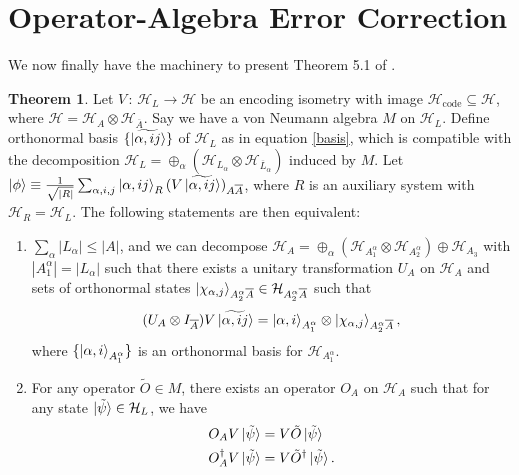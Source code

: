 \documentclass[12pt,a4paper]{report}
\numberwithin{equation}{section}
\newcommand{\Hcode}{\mathcal{H}_{\text{code}}}
\newcommand{\ol}[1]{\overline{#1}}
\theoremstyle{definition}
\theoremstyle{theorem}
\newtheorem{theorem}{Theorem}[section]
\theoremstyle{theorem}
\theoremstyle{example}
\theoremstyle{definition}
\begin{document}
\section{Operator-Algebra Error Correction}
We now finally have the machinery to present Theorem 5.1 of \cite{Harlow}.
\begin{theorem}\label{5.1}
	Let $V\,:\,\mathcal{H}_{L}\to \mathcal{H}$ be an encoding isometry with image $\Hcode\subseteq\mathcal{H}$, where $\mathcal{H}=\mathcal{H}_{A}\otimes\mathcal{H}_{\ol{A}}$. Say we have a von Neumann algebra $M$ on $\mathcal{H}_{L}$. Define orthonormal basis $\{\ket{\widetilde{\alpha,ij}}\}$ of $\mathcal{H}_{L}$ as in equation \ref{basis}, which is compatible with the decomposition $\mathcal{H}_{L}=\oplus_{\alpha}(\mathcal{H}_{L_{\alpha}}\otimes\mathcal{H}_{\ol{L}_{\alpha}})$ induced by $M$. Let $\ket{\phi}\equiv\frac{1}{\sqrt{|R|}}\sum_{\alpha,i,j}\ket{\alpha,ij}_{R}(V\ket{\widetilde{\alpha,ij}})_{A\ol{A}}$, where $R$ is an auxiliary system with $\mathcal{H}_{R}=\mathcal{H}_{L}$. The following statements are then equivalent:
	\begin{enumerate}
		\item \label{o1} $\sum_{\alpha}|L_{\alpha}|\leq|A|$, and we can decompose $\mathcal{H}_{A}=\oplus_{\alpha}(\mathcal{H}_{A_{1}^{\alpha}}\otimes\mathcal{H}_{A_{2}^{\alpha}})\oplus\mathcal{H}_{A_{3}}$ with $|A_{1}^{\alpha}|=|L_{\alpha}|$ such that there exists a unitary transformation $U_{A}$ on $\mathcal{H}_{A}$ and sets of orthonormal states $\ket{\chi_{\alpha,j}}_{A_{2}^{\alpha}\ol{A}}\in\mathcal{H}_{A_{2}^{\alpha}\ol{A}}$ such that
		\begin{equation}\label{O1}
			(U_{A}\otimes I_{\ol{A}})V\ket{\widetilde{\alpha,ij}}=\ket{\alpha,i}_{A_{1}^{\alpha}}\otimes\ket{\chi_{\alpha,j}}_{A_{2}^{\alpha}\ol{A}},
		\end{equation}
		where $\{\ket{\alpha,i}_{A_{1}^{\alpha}}\}$ is an orthonormal basis for $\mathcal{H}_{A_{1}^{\alpha}}$.
		\item \label{o2} For any operator $\tilde{O}\in M$, there exists an operator $O_{A}$ on $\mathcal{H}_{A}$ such that for any state $\ket{\tilde{\psi}}\in\mathcal{H}_{L}$, we have
		\begin{equation}\label{O2}
			\begin{aligned}
				O_{A}V\ket{\tilde{\psi}}&=V\tilde{O}\ket{\tilde{\psi}}\\
				O_{A}^{\dagger}V\ket{\tilde{\psi}}&=V\tilde{O}^{\dagger}\ket{\tilde{\psi}}.
			\end{aligned}
		\end{equation}

\end{enumerate}
\end{theorem}
\end{document}

